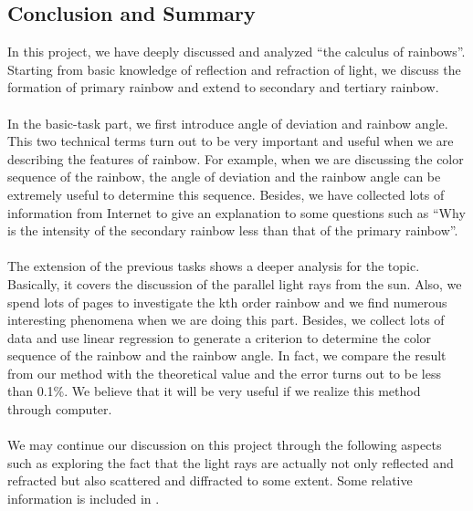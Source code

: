 \documentclass{article}
\begin{document}
\begin{spacing}{1.5}
\section{Conclusion and Summary}
In this project, we have deeply discussed and analyzed “the calculus of rainbows”. Starting from basic knowledge of reflection and refraction of light, we discuss the formation of primary rainbow and extend to secondary and tertiary rainbow.\\
\\
In the basic-task part, we first introduce angle of deviation and rainbow angle. This two technical terms turn out to be very important and useful when we are describing the features of rainbow. For example, when we are discussing the color sequence of the rainbow, the angle of deviation and the rainbow angle can be extremely useful to determine this sequence. Besides, we have collected lots of information from Internet to give an explanation to some questions such as “Why is the intensity of the secondary rainbow less than that of the primary rainbow”.\\
\\
The extension of the previous tasks shows a deeper analysis for the topic. Basically, it covers the discussion of the parallel light rays from the sun. Also, we spend lots of pages to investigate the kth order rainbow and we find numerous interesting phenomena when we are doing this part. Besides, we collect lots of data and use linear regression to generate a criterion to determine the color sequence of the rainbow and the rainbow angle. In fact, we compare the result from our method with the theoretical value and the error turns out to be less than 0.1\%. We believe that it will be very useful if we realize this method through computer.\\
\\
We may continue our discussion on this project through the following aspects such as exploring the fact that the light rays are actually not only reflected and refracted but also scattered and diffracted to some extent. Some relative information is included in \cite{Atoptics}.

\end{spacing}
\newpage
\end{document}
